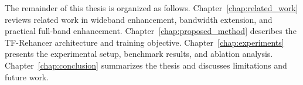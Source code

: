 The remainder of this thesis is organized as follows. Chapter~\ref{chap:related_work} reviews related work in wideband enhancement, bandwidth extension, and practical full-band enhancement. Chapter~\ref{chap:proposed_method} describes the TF-Rehancer architecture and training objective. Chapter~\ref{chap:experiments} presents the experimental setup, benchmark results, and ablation analysis. Chapter~\ref{chap:conclusion} summarizes the thesis and discusses limitations and future work.

